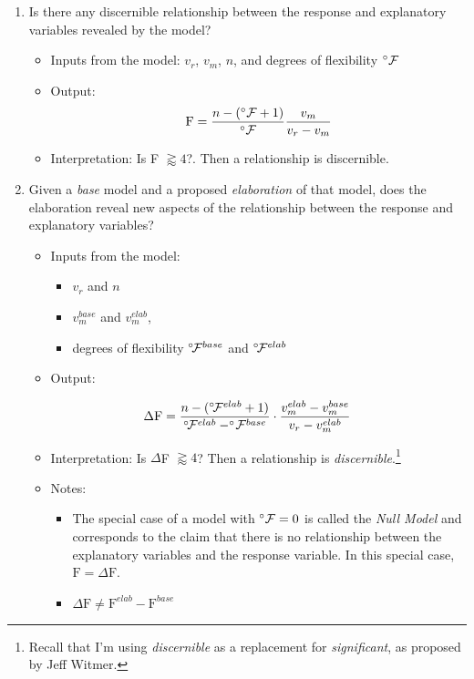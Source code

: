 \documentclass[]{book}
\providecommand{\tightlist}{%
  \setlength{\itemsep}{0pt}\setlength{\parskip}{0pt}}
\let\rmarkdownfootnote\footnote%
\def\footnote{\protect\rmarkdownfootnote}
\begin{document}
\begin{enumerate}
\def\labelenumi{\arabic{enumi}.}
\tightlist
\item
  Is there any discernible relationship between the response and explanatory variables revealed by the model?

  \begin{itemize}
  \tightlist
  \item
    Inputs from the model: \(v_r\), \(v_m\), \(n\), and degrees of flexibility \(^\circ{\cal F}\)
  \item
    Output:
    \[\mbox{F} = \frac{n - (^\circ{\cal F} + 1)}{^\circ{\cal F}} \frac{v_m}{v_r - v_m}\]
  \item
    Interpretation: Is F \(\gtrapprox 4\)?. Then a relationship is discernible.
  \end{itemize}
\item
  Given a \emph{base} model and a proposed \emph{elaboration} of that model, does the elaboration reveal new aspects of the relationship between the response and explanatory variables?

  \begin{itemize}
  \tightlist
  \item
    Inputs from the model:

    \begin{itemize}
    \tightlist
    \item
      \(v_r\) and \(n\)
    \item
      \(v_m^{base}\) and \(v_m^{elab}\),
    \item
      degrees of flexibility \(^\circ\!{\cal F}^{base}\) and \(^\circ\!{\cal F}^{elab}\)
    \end{itemize}
  \item
    Output:
  \end{itemize}

  \[\Delta \mbox{F} = \frac{n - (^\circ\!{\cal F}^{elab} + 1)}{^\circ\!{\cal F}^{elab} - ^\circ\!{\cal F}^{base}}  \cdot \frac{v_m^{elab} - v_m^{base}}{v_r - v_m^{elab}}\]

  \begin{itemize}
  \item
    Interpretation: Is \(\Delta\)F \(\gtrapprox 4\)? Then a relationship is \emph{discernible}.\footnote{Recall that I'm using \emph{discernible} as a replacement for \emph{significant}, as proposed by Jeff Witmer.}
  \item
    Notes:

    \begin{itemize}
    \tightlist
    \item
      The special case of a model with \(^\circ{\cal F} = 0\) is called the \emph{Null Model} and corresponds to the claim that there is no relationship between the explanatory variables and the response variable. In this special case, \(\mbox{F} = \Delta \mbox{F}\).
    \item
      \(\Delta \mbox{F} \neq \mbox{F}^{elab} - \mbox{F}^{base}\)
    \end{itemize}
  \end{itemize}
\end{enumerate}
\end{document}

